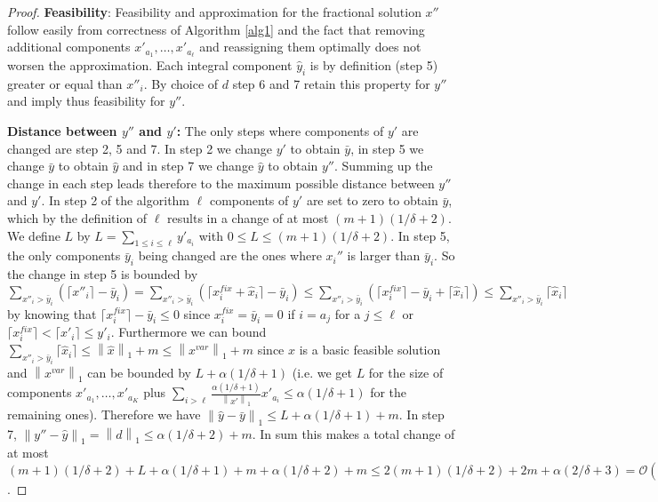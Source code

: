 \documentclass[a4paper,11pt]{article}
\newcommand{\nor}[1]{\left\|#1\right\|}
\begin{document}
\begin{proof}
	{\bf Feasibility}: Feasibility and approximation for the fractional solution $x''$ follow easily from correctness 
	of Algorithm \ref{alg1} and the fact that removing additional components $x'_{a_1}, \ldots ,x'_{a_{\ell}}$ and reassigning them
	optimally does not worsen
	the approximation. Each integral component $\hat{y}_i$ is by definition (step 5) greater or equal than $x''_i$. 
	By choice of $d$ step 6 and 7 retain this property for $y''$ and imply thus feasibility for $y''$.
	
	{\bf Distance between $y''$ and $y'$:}
	The only steps where components of $y'$ are changed are step 2, 5 and 7. In step 2 we change 
	$y'$ to obtain $\bar{y}$, in step 5 we change $\bar{y}$ to obtain $\hat{y}$ and in step 7
	we change $\hat{y}$ to obtain $y''$. Summing up the change in each step leads therefore to
	the maximum possible distance between $y''$ and $y'$. In step 2 of the algorithm $\ell$ components
	of $y'$ are set to zero to obtain $\bar{y}$, which by the definition of $\ell$ results in a change of at most $(m+1)(1/ \delta +2)$.
	We define $L$ by  
	$L = \sum_{1\leq i \leq \ell} y'_{a_i}$ with $0 \leq L \leq (m+1)(1/ \delta +2)$.
	In step 5, the only components $\bar{y}_i$ being changed are the ones where $x_i''$ is larger than $\bar{y}_i$. 
	So the change in step 5 is bounded by $\sum_{x''_i> \bar{y}_i} (\lceil x''_i \rceil - \bar{y}_i) = 
	\sum_{x''_i> \bar{y}_i} (\lceil x^{fix}_i + \hat{x}_i \rceil - \bar{y}_i) 
	\leq \sum_{x''_i> \bar{y}_i}(\lceil x^{fix}_i \rceil - \bar{y}_i +\lceil \hat{x}_i \rceil) 
	\leq \sum_{x''_i> \bar{y}_i}\lceil \hat{x}_i \rceil$ by
	knowing that $\lceil x^{fix}_i \rceil - \bar{y}_i \leq 0$ since $x^{fix}_i = \bar{y}_i = 0$ if $i= a_j$ for a $j \leq \ell$
	or $\lceil x^{fix}_i \rceil < \lceil x'_i \rceil \leq y'_i$. Furthermore we can bound 
	$\sum_{x''_i> \bar{y}_i}\lceil \hat{x}_i \rceil \leq \nor{\hat{x}}_1 +m \leq \nor{x^{var}}_1 +m$ since $\hat{x}$
	is a basic feasible solution and $\nor{x^{var}}_1$
	can be bounded by $L + \alpha(1/ \delta +1)$ (i.e. we get $L$ for the size of components 
	$x'_{a_1} , \ldots, x'_{a_K}$ plus 
	$\sum_{i> \ell} \frac{\alpha(1/\delta +1)}{\nor{x'}_1} x'_{a_i} \leq \alpha(1/ \delta +1)$ for the
	remaining ones). Therefore we have $\nor{\hat{y}-\bar{y}}_1 \leq L + \alpha(1/ \delta +1) + m$.
 	In step 7, $\nor{y'' - \hat{y}}_1 = \nor{d}_1 \leq \alpha(1/ \delta +2) +m$.
	In sum this makes a total change of at most $(m+1)(1/ \delta + 2)+L + \alpha (1/ \delta + 1)+m +\alpha(1/\delta+2) +m
	\leq 2(m+1)(1/\delta +2)+2m + \alpha(2/\delta +3) = \mathcal{O}(\frac{m + \alpha}{\delta})$.


\end{proof}
\end{document}
